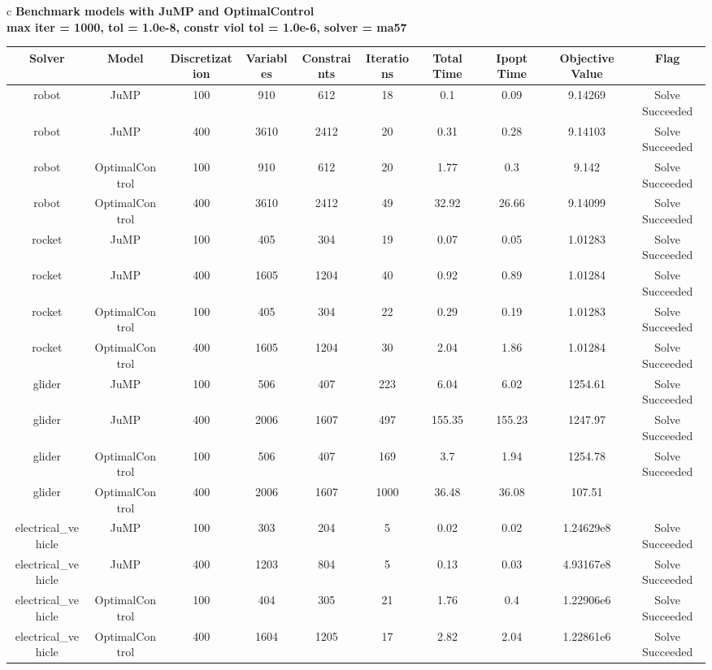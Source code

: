 \documentclass{standalone}
\begin{document}
\begin{tabular}{c}
\Large\textbf{Benchmark models with JuMP and OptimalControl}\\
\large\textbf{max iter = 1000, tol = 1.0e-8, constr viol tol = 1.0e-6, solver = ma57}\\
\begin{tabular}{cccccccccc}
  \hline
  \textbf{Solver} & \textbf{Model} & \textbf{Discretization} & \textbf{Variables} & \textbf{Constraints} & \textbf{Iterations} & \textbf{Total Time} & \textbf{Ipopt Time} & \textbf{Objective Value} & \textbf{Flag} \\\hline
  robot & JuMP & 100 & 910 & 612 & 18 & 0.1 & 0.09 & 9.14269 & Solve Succeeded \\
  robot & JuMP & 400 & 3610 & 2412 & 20 & 0.31 & 0.28 & 9.14103 & Solve Succeeded \\
  robot & OptimalControl & 100 & 910 & 612 & 20 & 1.77 & 0.3 & 9.142 & Solve Succeeded \\
  robot & OptimalControl & 400 & 3610 & 2412 & 49 & 32.92 & 26.66 & 9.14099 & Solve Succeeded \\
  rocket & JuMP & 100 & 405 & 304 & 19 & 0.07 & 0.05 & 1.01283 & Solve Succeeded \\
  rocket & JuMP & 400 & 1605 & 1204 & 40 & 0.92 & 0.89 & 1.01284 & Solve Succeeded \\
  rocket & OptimalControl & 100 & 405 & 304 & 22 & 0.29 & 0.19 & 1.01283 & Solve Succeeded \\
  rocket & OptimalControl & 400 & 1605 & 1204 & 30 & 2.04 & 1.86 & 1.01284 & Solve Succeeded \\
  glider & JuMP & 100 & 506 & 407 & 223 & 6.04 & 6.02 & 1254.61 & Solve Succeeded \\
  glider & JuMP & 400 & 2006 & 1607 & 497 & 155.35 & 155.23 & 1247.97 & Solve Succeeded \\
  glider & OptimalControl & 100 & 506 & 407 & 169 & 3.7 & 1.94 & 1254.78 & Solve Succeeded \\
  glider & OptimalControl & 400 & 2006 & 1607 & 1000 & 36.48 & 36.08 & 107.51 & \color{red}{Iterations Exceeded} \\
  electrical\_vehicle & JuMP & 100 & 303 & 204 & 5 & 0.02 & 0.02 & 1.24629e8 & Solve Succeeded \\
  electrical\_vehicle & JuMP & 400 & 1203 & 804 & 5 & 0.13 & 0.03 & 4.93167e8 & Solve Succeeded \\
  electrical\_vehicle & OptimalControl & 100 & 404 & 305 & 21 & 1.76 & 0.4 & 1.22906e6 & Solve Succeeded \\
  electrical\_vehicle & OptimalControl & 400 & 1604 & 1205 & 17 & 2.82 & 2.04 & 1.22861e6 & Solve Succeeded \\\hline
\end{tabular}
\end{tabular}
\end{document}

